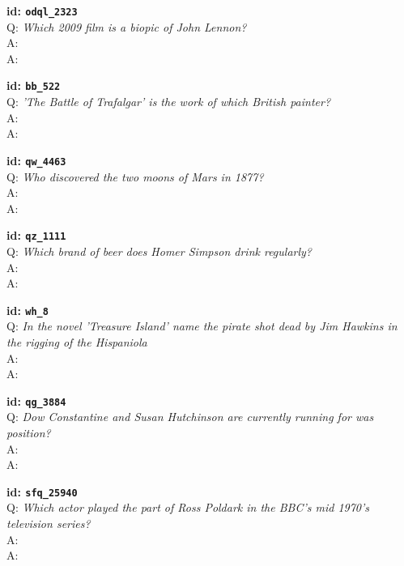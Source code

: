 \tiny{\setlength{\parindent}{0cm}
\textbf{id: \texttt{odql\_2323}} \\
Q: \textit{Which 2009 film is a biopic of John Lennon?} \\
A:  \\
A: }

\tiny{\setlength{\parindent}{0cm}
\textbf{id: \texttt{bb\_522}} \\
Q: \textit{'The Battle of Trafalgar' is the work of which British painter?} \\
A:  \\
A: }

\tiny{\setlength{\parindent}{0cm}
\textbf{id: \texttt{qw\_4463}} \\
Q: \textit{Who discovered the two moons of Mars in 1877?} \\
A:  \\
A: }

\tiny{\setlength{\parindent}{0cm}
\textbf{id: \texttt{qz\_1111}} \\
Q: \textit{Which brand of beer does Homer Simpson drink regularly?} \\
A:  \\
A: }

\tiny{\setlength{\parindent}{0cm}
\textbf{id: \texttt{wh\_8}} \\
Q: \textit{In the novel 'Treasure Island' name the pirate shot dead by Jim Hawkins in the rigging of the Hispaniola} \\
A:  \\
A: }

\tiny{\setlength{\parindent}{0cm}
\textbf{id: \texttt{qg\_3884}} \\
Q: \textit{Dow Constantine and Susan Hutchinson are currently running for was position?} \\
A:  \\
A: }

\tiny{\setlength{\parindent}{0cm}
\textbf{id: \texttt{sfq\_25940}} \\
Q: \textit{Which actor played the part of Ross Poldark in the BBC’s mid 1970’s television series?} \\
A:  \\
A: }

